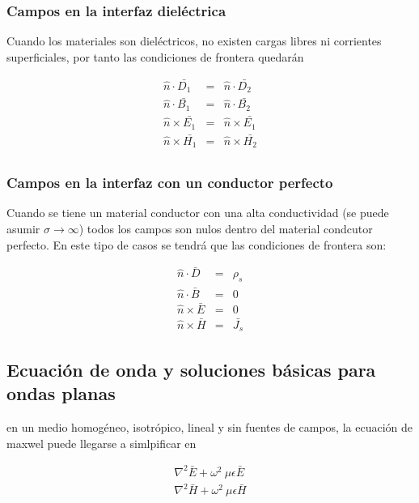 \subsubsection*{Campos en la interfaz dieléctrica}

Cuando los materiales son dieléctricos, no existen cargas libres ni corrientes superficiales, por tanto las condiciones de frontera quedarán

\begin{eqnarray*}
\hat{n} \cdot \bar{D_1} &=& \hat{n} \cdot \bar{D_2} \\
\hat{n} \cdot \bar{B_1} &=& \hat{n} \cdot \bar{B_2} \\
\hat{n} \times \bar{E_1} &=& \hat{n} \times \bar{E_1} \\
\hat{n} \times \bar{H_1} &=& \hat{n} \times \bar{H_2} \\
\end{eqnarray*}

\subsubsection*{Campos en la interfaz con un conductor perfecto}

Cuando se tiene un material conductor con una alta conductividad (se puede asumir $\sigma \to \infty$) todos los campos son nulos dentro del material condcutor perfecto. En este tipo de casos se tendrá que las condiciones de frontera son:


\begin{eqnarray*}
\hat{n} \cdot \bar{D} &=& \rho_s \\
\hat{n} \cdot \bar{B} &=& 0 \\
\hat{n} \times \bar{E} &=& 0 \\
\hat{n} \times \bar{H} &=& \bar{J_s}
\end{eqnarray*}

\subsection{Ecuación de onda y soluciones básicas para ondas planas}

en un medio homogéneo, isotrópico, lineal y sin fuentes de campos, la ecuación de maxwel puede llegarse a simlpificar en 

\begin{eqnarray*}
\nabla^2 \bar{E} + \omega^2 \ \mu \epsilon  \bar{E} \\
\nabla^2 \bar{H} + \omega^2 \ \mu \epsilon  \bar{H}
\end{eqnarray*}

